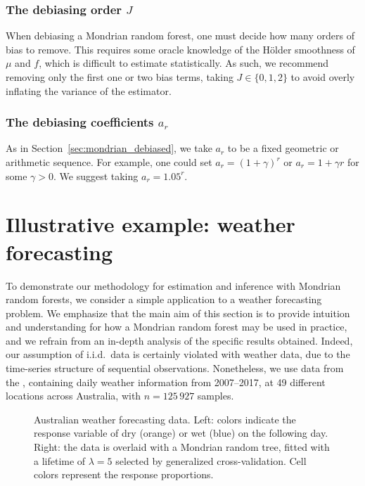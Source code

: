 \documentclass[11pt,lof]{puthesis}
\theoremstyle{break}
\theoremstyle{proof}
\begin{document}
\subsubsection*{The debiasing order \texorpdfstring{$J$}{J}}%

When debiasing a Mondrian random forest, one must decide
how many orders of bias to remove. This requires some
oracle knowledge of the H{\"o}lder smoothness of $\mu$ and $f$, which is
difficult to estimate statistically. As such, we recommend
removing only the first one or two bias terms, taking $J \in \{0,1,2\}$ to
avoid overly inflating the variance of the estimator.

\subsubsection*{The debiasing coefficients \texorpdfstring{$a_r$}{ar}}%

As in Section~\ref{sec:mondrian_debiased}, we take $a_r$ to be a fixed
geometric or arithmetic sequence. For example, one could set
$a_r = (1+\gamma)^r$ or $a_r = 1 + \gamma r$ for some $\gamma > 0$.
We suggest taking $a_r = 1.05^r$.

\section{Illustrative example: weather forecasting}%
\label{sec:mondrian_weather}

To demonstrate our methodology for estimation and inference with Mondrian random
forests, we consider a simple application
to a weather forecasting problem. We emphasize that the main aim of this
section is to provide intuition and understanding for how a Mondrian random
forest may be used in practice, and we refrain from an in-depth analysis of the
specific results obtained. Indeed, our assumption of i.i.d.\ data is
certainly violated with weather data, due to the time-series
structure of sequential observations.
Nonetheless, we use data from the \citet{bureau2017daily}, containing daily
weather information from 2007--2017, at 49 different
locations across Australia, with $n = 125\,927$ samples.

\begin{figure}[b!]
\centering
\begin{subfigure}{0.49\textwidth}
\centering
\end{subfigure}
\begin{subfigure}{0.49\textwidth}
\centering
\end{subfigure}
\caption[Australian weather forecasting data]{
Australian weather forecasting data. Left: colors indicate the response
variable of dry (orange) or wet (blue) on the following
day. Right: the data is overlaid with a Mondrian random tree,
fitted with a lifetime of $\lambda = 5$
selected by generalized cross-validation. Cell colors represent the response
proportions.}
\label{fig:mondrian_weather_data}
\end{figure}
\end{document}
